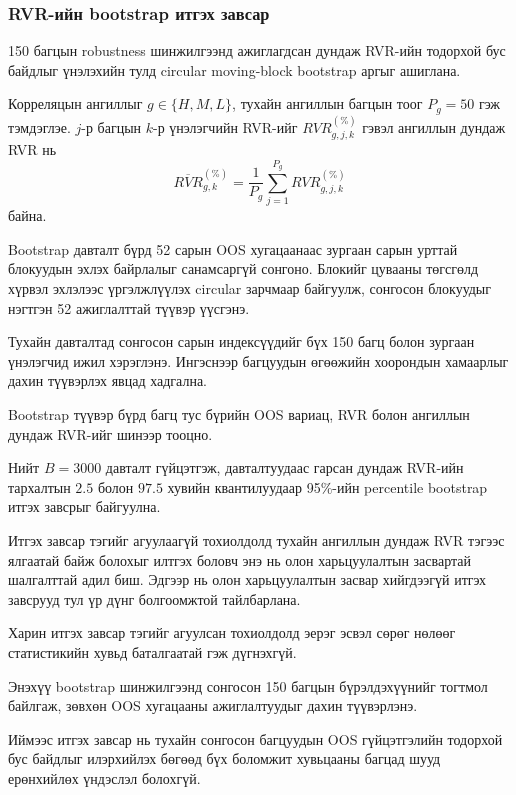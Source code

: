 \subsubsection{RVR-ийн bootstrap
	итгэх завсар}
\label{subsubsec:bootstrap_rvr}

150 багцын robustness шинжилгээнд
ажиглагдсан дундаж RVR-ийн
тодорхой бус байдлыг үнэлэхийн
тулд circular moving-block
bootstrap аргыг ашиглана.

Корреляцын ангиллыг
$g\in\{H,M,L\}$,
тухайн ангиллын багцын
тоог $P_g=50$ гэж тэмдэглэе.
$j$-р багцын $k$-р үнэлэгчийн
RVR-ийг $RVR_{g,j,k}^{(\%)}$
гэвэл ангиллын дундаж RVR нь
\[
\overline{RVR}_{g,k}^{(\%)}
=
\frac{1}{P_g}
\sum_{j=1}^{P_g}
RVR_{g,j,k}^{(\%)}
\]
байна.

Bootstrap давталт бүрд 52 сарын
OOS хугацаанаас зургаан сарын
урттай блокуудын эхлэх байрлалыг
санамсаргүй сонгоно. Блокийг
цувааны төгсгөлд хүрвэл эхлэлээс
үргэлжлүүлэх circular зарчмаар
байгуулж, сонгосон блокуудыг
нэгтгэн 52 ажиглалттай түүвэр
үүсгэнэ.

Тухайн давталтад сонгосон
сарын индексүүдийг бүх
150 багц болон зургаан
үнэлэгчид ижил хэрэглэнэ.
Ингэснээр багцуудын өгөөжийн
хоорондын хамаарлыг дахин
түүвэрлэх явцад хадгална.

Bootstrap түүвэр бүрд багц
тус бүрийн OOS вариац,
RVR болон ангиллын дундаж
RVR-ийг шинээр тооцно.

Нийт $B=3000$ давталт
гүйцэтгэж, давталтуудаас
гарсан дундаж RVR-ийн
тархалтын $2.5$ болон
$97.5$ хувийн квантилуудаар
95\%-ийн percentile bootstrap
итгэх завсрыг байгуулна.

Итгэх завсар тэгийг агуулаагүй
тохиолдолд тухайн ангиллын
дундаж RVR тэгээс ялгаатай
байж болохыг илтгэх боловч
энэ нь олон харьцуулалтын
засвартай шалгалттай адил биш. Эдгээр нь олон харьцуулалтын
засвар хийгдээгүй итгэх завсрууд
тул үр дүнг болгоомжтой тайлбарлана.

Харин итгэх завсар тэгийг
агуулсан тохиолдолд эерэг
эсвэл сөрөг нөлөөг статистикийн
хувьд баталгаатай гэж
дүгнэхгүй.

Энэхүү bootstrap шинжилгээнд
сонгосон 150 багцын
бүрэлдэхүүнийг тогтмол
байлгаж, зөвхөн OOS
хугацааны ажиглалтуудыг
дахин түүвэрлэнэ.

Иймээс итгэх завсар нь
тухайн сонгосон багцуудын
OOS гүйцэтгэлийн тодорхой
бус байдлыг илэрхийлэх
бөгөөд бүх боломжит
хувьцааны багцад шууд
ерөнхийлөх үндэслэл
болохгүй.


